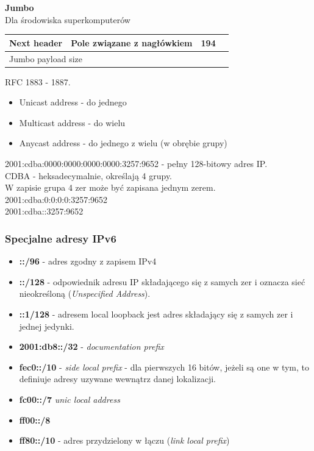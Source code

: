 \textbf{Jumbo}\\
Dla środowiska superkomputerów
\begin{table}[h]
	\begin{tabular}{|l|l|l|l|l|}
		\hline
		Next header & Pole związane z nagłówkiem & 194 & \multicolumn{2}{l|}{} \\ \hline
		\multicolumn{5}{|l|}{Jumbo payload size}                               \\ \hline
	\end{tabular}
\end{table}
RFC 1883 - 1887.

\begin{itemize}
	\item Unicast address - do jednego
	\item Multicast address - do wielu
	\item Anycast address - do jednego z wielu (w obrębie grupy)
\end{itemize}

2001:cdba:0000:0000:0000:0000:3257:9652 - pełny 128-bitowy adres IP.\\
CDBA - heksadecymalnie, określają 4 grupy.\\
W zapisie grupa 4 zer może być zapisana jednym zerem.\\
2001:cdba:0:0:0:0:3257:9652\\
2001:cdba::3257:9652

\subsubsection{Specjalne adresy IPv6}
\begin{itemize}
	\item \textbf{::/96} - adres zgodny z zapisem IPv4
	\item \textbf{::/128} - odpowiednik adresu IP składającego się z samych zer i oznacza sieć nieokreśloną (\emph{Unspecified Address}).
	\item \textbf{::1/128} - adresem local loopback jest adres składający się z samych zer i jednej jedynki.
	\item \textbf{2001:db8::/32} - \emph{documentation prefix}
	\item \textbf{fec0::/10} - \emph{side local prefix} - dla pierwszych 16 bitów, jeżeli są one w tym, to definiuje adresy uzywane wewnątrz danej lokalizacji.
	\item \textbf{fc00::/7} \emph{unic local address}
	\item \textbf{ff00::/8}
	\item \textbf{ff80::/10} - adres przydzielony w łączu (\emph{link local prefix})
\end{itemize}

